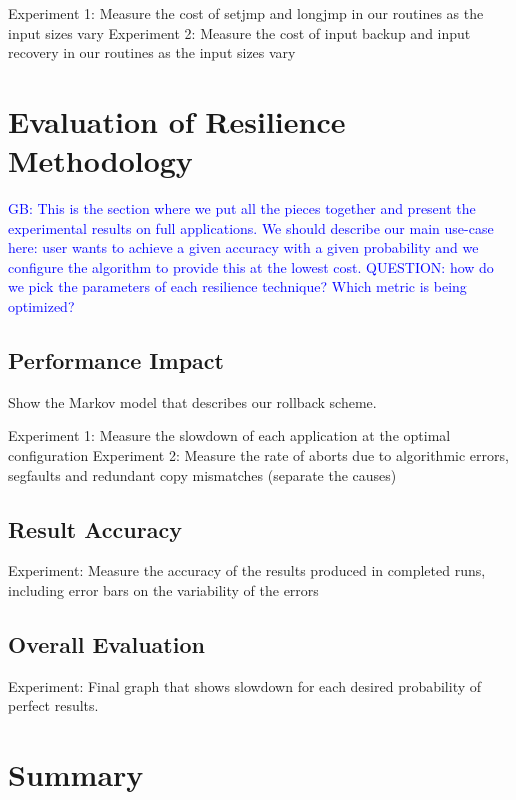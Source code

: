 \documentclass[prodmode,acmtecs]{acmconf} %
\newcommand{\greg}[1]{%
  \textcolor{blue}{GB: #1}
}
\begin{document}
Experiment 1: Measure the cost of setjmp and longjmp in our routines as the input sizes vary
Experiment 2: Measure the cost of input backup and input recovery in our routines as the input sizes vary

\section{Evaluation of Resilience Methodology}
\label{sec:eval}

\greg{This is the section where we put all the pieces together and present the experimental results on full applications. We should describe our main use-case here: user wants to achieve a given accuracy with a given probability and we configure the algorithm to provide this at the lowest cost. QUESTION: how do we pick the parameters of each resilience technique? Which metric is being optimized?}

\subsection{Performance Impact}
\label{sec:eval:perf}

Show the Markov model that describes our rollback scheme.

Experiment 1: Measure the slowdown of each application at the optimal configuration
Experiment 2: Measure the rate of aborts due to algorithmic errors, segfaults and redundant copy mismatches (separate the causes)

\subsection{Result Accuracy}
\label{sec:eval:acc}

Experiment: Measure the accuracy of the results produced in completed runs, including error bars on the variability of the errors

\subsection{Overall Evaluation}
\label{sec:eval:overall}

Experiment: Final graph that shows slowdown for each desired probability of perfect results.

\section{Summary}
\label{sec:summary}
\end{document}
